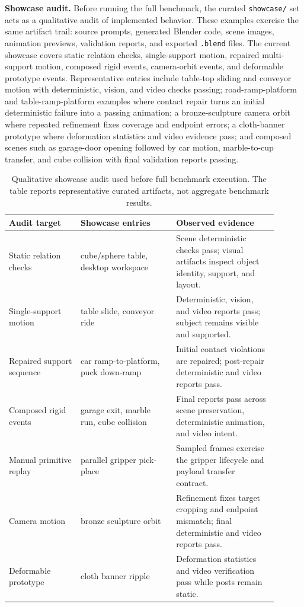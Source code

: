 \documentclass{article}
\newcommand{\code}[1]{\texttt{#1}}
\begin{document}
\textbf{Showcase audit.}
Before running the full benchmark, the curated \code{showcase/} set acts as a qualitative audit of implemented behavior. These examples exercise the same artifact trail: source prompts, generated Blender code, scene images, animation previews, validation reports, and exported \code{.blend} files. The current showcase covers static relation checks, single-support motion, repaired multi-support motion, composed rigid events, camera-orbit events, and deformable prototype events. Representative entries include table-top sliding and conveyor motion with deterministic, vision, and video checks passing; road-ramp-platform and table-ramp-platform examples where contact repair turns an initial deterministic failure into a passing animation; a bronze-sculpture camera orbit where repeated refinement fixes coverage and endpoint errors; a cloth-banner prototype where deformation statistics and video evidence pass; and composed scenes such as garage-door opening followed by car motion, marble-to-cup transfer, and cube collision with final validation reports passing.

\begin{table}[t]
\centering
\small
\caption{Qualitative showcase audit used before full benchmark execution. The table reports representative curated artifacts, not aggregate benchmark results.}
\label{tab:showcase-audit}
\begin{tabular}{p{0.24\linewidth}p{0.32\linewidth}p{0.34\linewidth}}
\toprule
Audit target & Showcase entries & Observed evidence \\
\midrule
Static relation checks & cube/sphere table, desktop workspace & Scene deterministic checks pass; visual artifacts inspect object identity, support, and layout. \\
Single-support motion & table slide, conveyor ride & Deterministic, vision, and video reports pass; subject remains visible and supported. \\
Repaired support sequence & car ramp-to-platform, puck down-ramp & Initial contact violations are repaired; post-repair deterministic and video reports pass. \\
Composed rigid events & garage exit, marble run, cube collision & Final reports pass across scene preservation, deterministic animation, and video intent. \\
Manual primitive replay & parallel gripper pick-place & Sampled frames exercise the gripper lifecycle and payload transfer contract. \\
Camera motion & bronze sculpture orbit & Refinement fixes target cropping and endpoint mismatch; final deterministic and video reports pass. \\
Deformable prototype & cloth banner ripple & Deformation statistics and video verification pass while posts remain static. \\
\bottomrule
\end{tabular}
\end{table}
\end{document}
